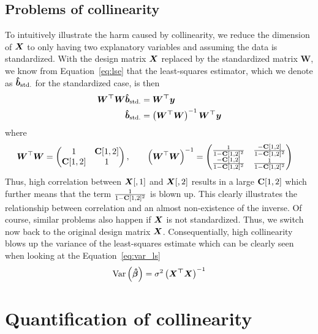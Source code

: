 \documentclass[11pt,a4paper,twoside]{book}\usepackage[]{graphicx}\usepackage[]{xcolor}
\begin{document}
\subsection{Problems of collinearity}

To intuitively illustrate the harm caused by collinearity, we reduce the dimension of ${\boldsymbol{X}}$ to only having two explanatory variables and assuming the data is standardized. With the design matrix ${\boldsymbol{X}}$ replaced by the standardized matrix $\boldsymbol{W}$, we know from Equation~\eqref{eq:lse} that the least-squares estimator, which we denote as ${\boldsymbol{\hat{{b}}}}_\text{std.}$ for the standardized case, is then
\begin{align*}
\boldsymbol{W^\top W}{\boldsymbol{\hat{{b}}}}_\text{std.}&=\boldsymbol{W^\top y}\\
{\boldsymbol{\hat{{b}}}}_\text{std.}&=\left(\boldsymbol{W^\top W}\right)^{-1}\boldsymbol{W^\top y}
\end{align*}
where 
\begin{align*}
{\boldsymbol{W}}^\top {\boldsymbol{W}}&=
\begin{pmatrix}
1&{\mathbf{C}}[1,2] \\ {\mathbf{C}}[1,2] &1
\end{pmatrix},\qquad
\left({\boldsymbol{W}}^\top {\boldsymbol{W}} \right)^{-1}=
\begin{pmatrix}
\frac{1}{1-{\mathbf{C}}[1,2]^2}        & \frac{-{\mathbf{C}}[1,2]}{1-{\mathbf{C}}[1,2]^2} \\
\frac{-{\mathbf{C}}[1,2]}{1-{\mathbf{C}}[1,2]^2} & \frac{1}{1-{\mathbf{C}}[1,2]^2}
\end{pmatrix}
\end{align*}
Thus, high correlation between ${\boldsymbol{X}}[,1]$ and ${\boldsymbol{X}}[,2]$ results in a large ${\mathbf{C}}[1,2]$ which further means that the term $\frac{1}{1-{\mathbf{C}}[1,2]^2}$ is blown up. This clearly illustrates the relationship between correlation and an almost non-existence of the inverse. Of course, similar problems also happen if ${\boldsymbol{X}}$ is not standardized. Thus, we switch now back to the original design matrix ${\boldsymbol{X}}$. Consequentially, high collinearity blows up the variance of the least-squares estimate which can be clearly seen when looking at the Equation~\eqref{eq:var_ls}
\begin{align*}
\operatorname{Var}\left(\boldsymbol{\hat\beta}\right)=\sigma^2\left(\boldsymbol{X^\top X}\right)^{-1}
\end{align*}

\newpage
\section{Quantification of collinearity}
\end{document}
